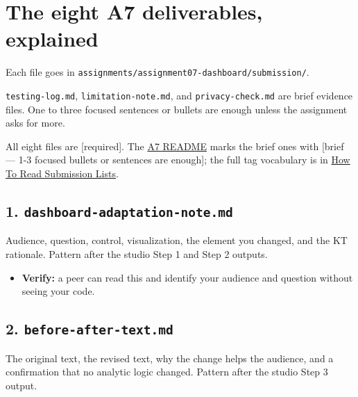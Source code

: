 \documentclass[
  letterpaper,
  DIV=11,
  numbers=noendperiod,
  oneside]{scrreprt}
\providecommand{\tightlist}{%
  \setlength{\itemsep}{0pt}\setlength{\parskip}{0pt}}
\begin{document}
\section*{The eight A7 deliverables,
explained}\label{the-eight-a7-deliverables-explained}


Each file goes in
\texttt{assignments/assignment07-dashboard/submission/}.

\texttt{testing-log.md}, \texttt{limitation-note.md}, and
\texttt{privacy-check.md} are brief evidence files. One to three focused
sentences or bullets are enough unless the assignment asks for more.

All eight files are {[}required{]}. The
\href{../../assignments/assignment07-dashboard/README.md}{A7 README}
marks the brief ones with {[}brief --- 1-3 focused bullets or sentences
are enough{]}; the full tag vocabulary is in
\hyperref[how-to-read-submission-lists]{How To Read Submission Lists}.

\subsection*{\texorpdfstring{1.
\texttt{dashboard-adaptation-note.md}}{1. dashboard-adaptation-note.md}}\label{dashboard-adaptation-note.md}

Audience, question, control, visualization, the element you changed, and
the KT rationale. Pattern after the studio Step 1 and Step 2 outputs.

\begin{itemize}
\tightlist
\item
  \textbf{Verify:} a peer can read this and identify your audience and
  question without seeing your code.
\end{itemize}

\subsection*{\texorpdfstring{2.
\texttt{before-after-text.md}}{2. before-after-text.md}}\label{before-after-text.md}

The original text, the revised text, why the change helps the audience,
and a confirmation that no analytic logic changed. Pattern after the
studio Step 3 output.
\end{document}
